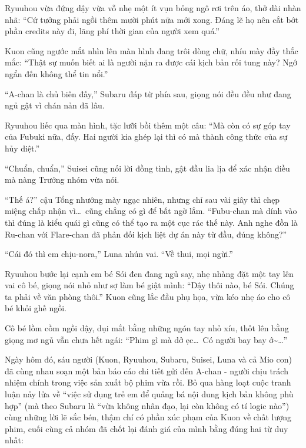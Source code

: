 \documentclass[../main.tex]{subfiles}
\begin{document}
Ryuuhou vừa đứng dậy vừa vỗ nhẹ một ít vụn bỏng ngô rơi trên áo, thở dài nhàn nhã: ``Cứ tưởng phải ngồi thêm mười phút nữa mới xong. Đáng lẽ họ nên cắt bớt phần credits này đi, lãng phí thời gian của người xem quá.''

Kuon cũng ngước mắt nhìn lên màn hình đang trôi dòng chữ, nhíu mày đầy thắc mắc: ``Thật sự muốn biết ai là người nặn ra được cái kịch bản rối tung này? Ngớ ngẩn đến không thể tin nổi.''

``A-chan là chủ biên đấy,'' Subaru đáp từ phía sau, giọng nói đều đều như đang ngủ gật vì chán nản đã lâu.

Ryuuhou liếc qua màn hình, tặc lưỡi bồi thêm một câu: ``Mà còn có sự góp tay của Fubuki nữa, đấy. Hai người kia ghép lại thì có mà thành công thức của sự hủy diệt.''

``Chuẩn, chuẩn,'' Suisei cũng nối lời đồng tình, gật đầu lia lịa để xác nhận điều mà nàng Trưởng nhóm vừa nói.

``Thế á?'' cậu Tổng nhướng mày ngạc nhiên, nhưng chỉ sau vài giây thì chẹp miệng chấp nhận vì\dots\ cũng chẳng có gì để bất ngờ lắm. ``Fubu-chan mà dính vào thì đúng là kiểu quái gì cũng có thể tạo ra một cục rác thế này. Anh nghe đồn là Ru-chan với Flare-chan đã phản đối kịch liệt dự án này từ đầu, đúng không?''

``Cái đó thì em chịu-nora,'' Luna nhún vai. ``Về thui, mọi ngừi.''

Ryuuhou bước lại cạnh em bé Sói đen đang ngủ say, nhẹ nhàng đặt một tay lên vai cô bé, giọng nói nhỏ như sợ làm bé giật mình: ``Dậy thôi nào, bé Sói. Chúng ta phải về văn phòng thôi.'' Kuon cũng lắc đầu phụ họa, vừa kéo nhẹ áo cho cô bé khỏi ghế ngồi.

Cô bé lồm cồm ngồi dậy, dụi mắt bằng những ngón tay nhỏ xíu, thốt lên bằng giọng mơ ngủ vẫn chưa hết ngái: ``Phim gì mà dở ẹc\dots\ Có người bay bay ớ\~{}\dots''

\ct

Ngày hôm đó, sáu người (Kuon, Ryuuhou, Subaru, Suisei, Luna và cả Mio con) đã cùng nhau soạn một bản báo cáo chi tiết gửi đến A-chan - người chịu trách nhiệm chính trong việc sản xuất bộ phim vừa rồi. Bỏ qua hàng loạt cuộc tranh luận nảy lửa về ``việc sử dụng trẻ em để quảng bá nội dung kịch bản không phù hợp'' (mà theo Subaru là ``vừa không nhân đạo, lại còn không có tí logic nào'') cùng những lời lẽ sắc bén, thậm chí có phần xúc phạm của Kuon về chất lượng phim, cuối cùng cả nhóm đã chốt lại đánh giá của mình bằng đúng hai từ duy nhất:

\end{document}
